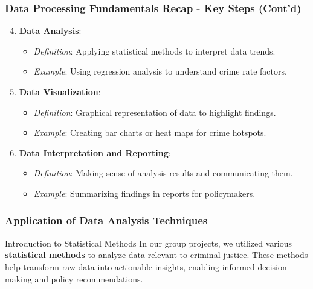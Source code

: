 \documentclass[aspectratio=169]{beamer}
\begin{document}
\begin{frame}[fragile]
    \frametitle{Data Processing Fundamentals Recap - Key Steps (Cont'd)}
    \begin{enumerate}
        \setcounter{enumi}{3}  %
        \item \textbf{Data Analysis}:
        \begin{itemize}
            \item \textit{Definition}: Applying statistical methods to interpret data trends.
            \item \textit{Example}: Using regression analysis to understand crime rate factors.
        \end{itemize}
        
        \item \textbf{Data Visualization}:
        \begin{itemize}
            \item \textit{Definition}: Graphical representation of data to highlight findings.
            \item \textit{Example}: Creating bar charts or heat maps for crime hotspots.
        \end{itemize}

        \item \textbf{Data Interpretation and Reporting}:
        \begin{itemize}
            \item \textit{Definition}: Making sense of analysis results and communicating them.
            \item \textit{Example}: Summarizing findings in reports for policymakers.
        \end{itemize}
    \end{enumerate}
\end{frame}

\begin{frame}[fragile]
    \frametitle{Application of Data Analysis Techniques}
    \begin{block}{Introduction to Statistical Methods}
        In our group projects, we utilized various \textbf{statistical methods} to analyze data relevant to criminal justice. These methods help transform raw data into actionable insights, enabling informed decision-making and policy recommendations.
    \end{block}
\end{frame}
\end{document}
